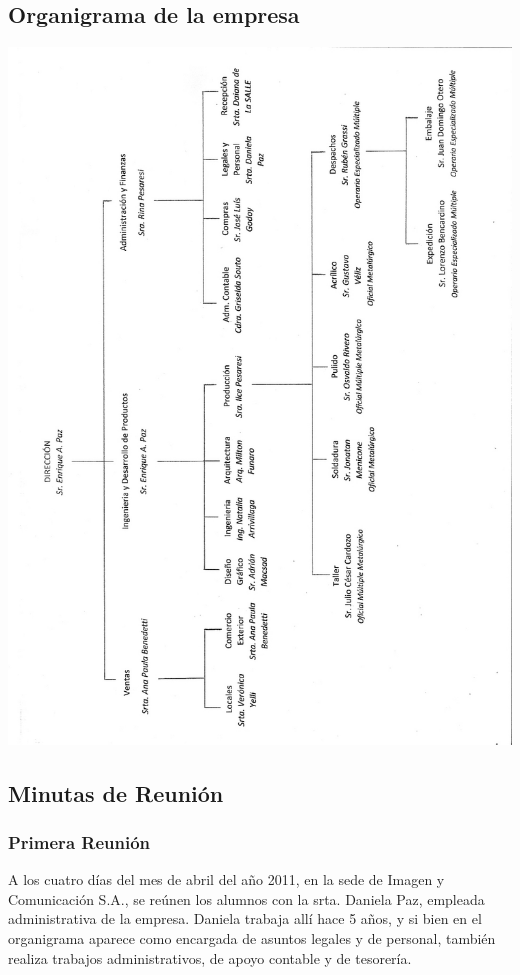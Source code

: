 \documentclass[a4paper,10pt,titlepage]{article}
\begin{document}
\subsection{Organigrama de la empresa}
\begin{center}
\includegraphics[width=450pt]{./imagenycomunicacion.png}
\end{center}

\newpage

\subsection{Minutas de Reuni\'on}
\subsubsection{Primera Reuni\'on}
A los cuatro días del mes de abril del a\~no 2011, en la sede de Imagen y Comunicaci\'on S.A., se re\'unen los alumnos con la srta. Daniela Paz, empleada administrativa de la empresa.
Daniela trabaja all\'i hace 5 a\~nos, y si bien en el organigrama aparece como encargada de asuntos legales y de personal, tambi\'en realiza trabajos administrativos, de apoyo contable y de tesorer\'ia.
\end{document}
